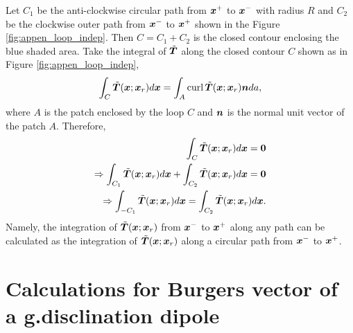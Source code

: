 \documentclass[11pt,letterpaper]{article}
\begin{document}
Let $C_1$ be the anti-clockwise circular path from $\bfx^+$ to $\bfx^-$ with radius $R$ and $C_2$ be the clockwise outer path from $\bfx^-$ to $\bfx^+$ shown in the Figure \ref{fig:appen_loop_indep}. Then $C = C_1+C_2$ is the closed contour enclosing the blue shaded area. Take the integral of $\tilde{\bfT}$ along the closed contour $C$ shown as in Figure \ref{fig:appen_loop_indep},
\begin{eqnarray*}
 \int_{C} \tilde{\bfT}(\bfx; \bfx_r) d\bfx = \int_A \curl \tilde{\bfT}(\bfx; \bfx_r) \bfn d a,
\end{eqnarray*}
where $A$ is the patch enclosed by the loop $C$ and $\bfn$ is the normal unit vector of the patch $A$. Therefore, 
\begin{eqnarray*}
 \int_{C} \tilde{\bfT}(\bfx; \bfx_r) d\bfx = \bf0 \\
 \Rightarrow \int_{C_1} \tilde{\bfT}(\bfx; \bfx_r) d\bfx + \int_{C_2} \tilde{\bfT}(\bfx; \bfx_r) d\bfx = \bf0 \\
 \Rightarrow \int_{-C_1}\tilde {\bfT}(\bfx; \bfx_r) d\bfx = \int_{C_2} \tilde{\bfT} (\bfx; \bfx_r)d\bfx.
\end{eqnarray*}
Namely, the integration of $\tilde{\bfT}(\bfx;\bfx_r)$ from $\bfx^-$ to $\bfx^+$ along any path can be calculated as the integration of $\tilde{\bfT}(\bfx;\bfx_r)$ along a circular path from $\bfx^-$ to $\bfx^+$.


\section{Calculations for Burgers vector of a g.disclination dipole}\label{append:calculation_dipole}
\end{document}
